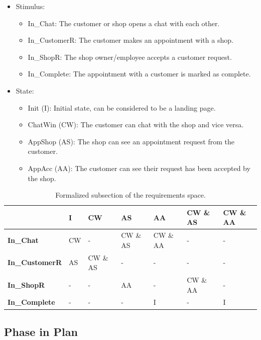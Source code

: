 \documentclass[12pt]{article}
\begin{document}
\begin{itemize}
    \item Stimulus:
    \begin{itemize}
        \item In\_Chat: The customer or shop opens a chat with each other.
        \item In\_CustomerR: The customer makes an appointment with a shop.
        \item In\_ShopR: The shop owner/employee accepts a customer request.
        \item In\_Complete: The appointment with a customer is marked as complete.
    \end{itemize}
    \item State:
    \begin{itemize}
        \item Init (I): Initial state, can be considered to be a landing page.
        \item ChatWin (CW): The customer can chat with the shop and vice versa.
        \item AppShop (AS): The shop can see an appointment request from the customer.
        \item AppAcc (AA): The customer can see their request has been accepted by the shop.
    \end{itemize}
\end{itemize}
\newpage
\begin{longtable}{| p{3cm} | p{1cm} | p{1cm}| p{1cm} | p{1cm}| p{1cm}| p{1cm}|}
\caption{Formalized subsection of the requirements space.}
\label{tab:formal}
\\ \hline
\textbf{} & \textbf{I} & \textbf{CW} &\textbf{AS} & \textbf{AA} & \textbf{CW \& AS}  & \textbf{CW \& AA} \\
\hline
\endfirsthead

\textbf{In\_Chat} & CW & - & CW \& AS  & CW \& AA & - & - \\
\hline
\textbf{In\_CustomerR} & AS & CW \& AS & -  & - & - & -  \\
\hline
\textbf{In\_ShopR} & - & - & AA & - & CW \& AA & - \\
\hline
\textbf{In\_Complete} & - & - & - & I & - & I \\
\hline
\end{longtable}

\subsection{Phase in Plan}
\end{document}
